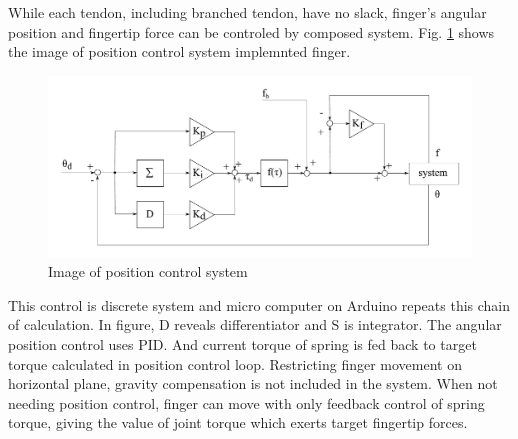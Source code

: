 \documentclass{llncs}
\begin{document}

While each tendon, including branched tendon, have no slack, finger's angular position and fingertip force can be controled by composed system.
Fig. \ref{fig:control} shows the image of position control system implemnted finger.
	\begin{figure}[tb]
		\centering
		\includegraphics[width=\textwidth]{./figure/control.pdf}
		\caption{Image of position control system}
		\label{fig:control}
	\end{figure}
This control is discrete system and micro computer on Arduino repeats this chain of calculation.
In figure, D reveals differentiator and S is integrator.
The angular position control uses PID.
And current torque of spring is fed back to target torque calculated in position control loop.
Restricting finger movement on horizontal plane, gravity compensation is not included in the system.
When not needing position control, finger can move with only feedback control of spring torque, giving the value of joint torque which exerts target fingertip forces.
\end{document}
